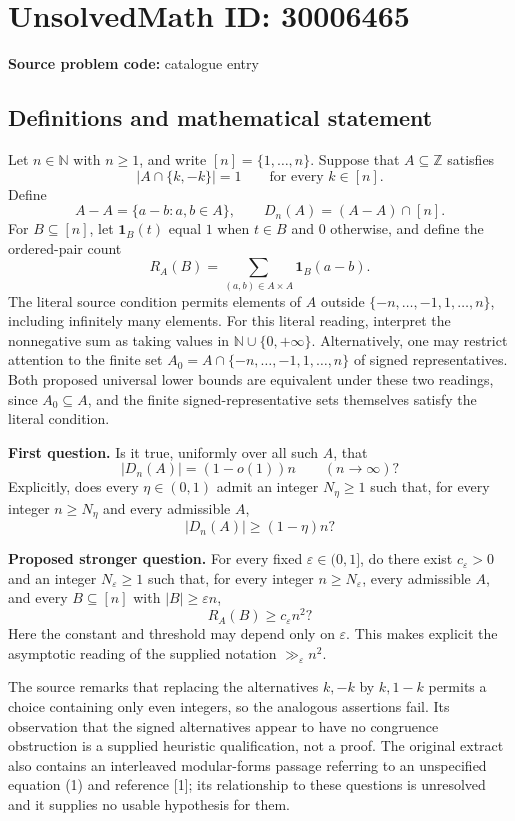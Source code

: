 \documentclass[11pt]{article}
\newcommand{\N}{\mathbb{N}}
\newcommand{\Z}{\mathbb{Z}}
\begin{document}
\section*{UnsolvedMath ID: 30006465}
\textbf{Source problem code:} catalogue entry
\subsection{Definitions and mathematical statement}
Let \(n\in\N\) with \(n\geq 1\), and write \([n]=\{1,\ldots,n\}\). Suppose that \(A\subseteq\Z\) satisfies
\[
\bigl|A\cap\{k,-k\}\bigr|=1\qquad\text{for every }k\in[n].
\]
Define
\[
A-A=\{a-b:a,b\in A\},\qquad D_n(A)=(A-A)\cap[n].
\]
For \(B\subseteq[n]\), let \(\mathbf 1_B(t)\) equal \(1\) when \(t\in B\) and \(0\) otherwise, and define the ordered-pair count
\[
R_A(B)=\sum_{(a,b)\in A\times A}\mathbf 1_B(a-b).
\]
The literal source condition permits elements of \(A\) outside \(\{-n,\ldots,-1,1,\ldots,n\}\), including infinitely many elements. For this literal reading, interpret the nonnegative sum as taking values in \(\N\cup\{0,+\infty\}\). Alternatively, one may restrict attention to the finite set \(A_0=A\cap\{-n,\ldots,-1,1,\ldots,n\}\) of signed representatives. Both proposed universal lower bounds are equivalent under these two readings, since \(A_0\subseteq A\), and the finite signed-representative sets themselves satisfy the literal condition.

\textbf{First question.} Is it true, uniformly over all such \(A\), that
\[
|D_n(A)|=(1-o(1))n\qquad(n\to\infty)?
\]
Explicitly, does every \(\eta\in(0,1)\) admit an integer \(N_\eta\geq1\) such that, for every integer \(n\geq N_\eta\) and every admissible \(A\),
\[
|D_n(A)|\geq(1-\eta)n?
\]

\textbf{Proposed stronger question.} For every fixed \(\varepsilon\in(0,1]\), do there exist \(c_\varepsilon>0\) and an integer \(N_\varepsilon\geq1\) such that, for every integer \(n\geq N_\varepsilon\), every admissible \(A\), and every \(B\subseteq[n]\) with \(|B|\geq\varepsilon n\),
\[
R_A(B)\geq c_\varepsilon n^2?
\]
Here the constant and threshold may depend only on \(\varepsilon\). This makes explicit the asymptotic reading of the supplied notation \(\gg_\varepsilon n^2\).

The source remarks that replacing the alternatives \(k,-k\) by \(k,1-k\) permits a choice containing only even integers, so the analogous assertions fail. Its observation that the signed alternatives appear to have no congruence obstruction is a supplied heuristic qualification, not a proof. The original extract also contains an interleaved modular-forms passage referring to an unspecified equation (1) and reference [1]; its relationship to these questions is unresolved and it supplies no usable hypothesis for them.
\end{document}
